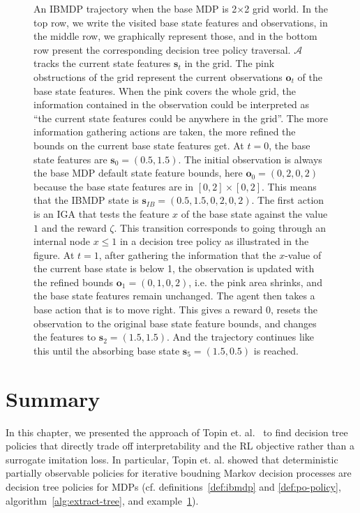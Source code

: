 \begin{figure}
\begin{tikzpicture}[scale=0.6]
    
\end{tikzpicture}
\caption{An IBMDP trajectory when the base MDP is 2$\times$2 grid world. In the top row, we write the visited base state features and observations, in the middle row, we graphically represent those, and in the bottom row present the corresponding decision tree policy traversal.
$\mathcal{A}$ tracks the current state features $\boldsymbol{s}_t$ in the grid.
The pink obstructions of the grid represent the current observations $\boldsymbol{o}_t$ of the base state features.
When the pink covers the whole grid, the information contained in the observation could be interpreted as ``the current state features could be anywhere in the grid''.
The more information gathering actions are taken, the more refined the bounds on the current base state features get.
At $t=0$, the base state features are $\boldsymbol{s}_0 = (0.5, 1.5)$. 
The initial observation is always the base MDP default state feature bounds, here $\boldsymbol{o}_0=(0, 2, 0, 2)$ because the base state features are in $[0, 2] \times [0, 2]$.
This means that the IBMDP state is $\boldsymbol{s}_{IB} = (0.5, 1.5, 0, 2, 0, 2)$.
The first action is an IGA that tests the feature $x$ of the base state against the value $1$ and the reward $\zeta$. 
This transition corresponds to going through an internal node $ x\leq 1$ in a decision tree policy as illustrated in the figure. 
At $t=1$, after gathering the information that the $x$-value of the current base state is below 1, the observation is updated with the refined bounds $\boldsymbol{o}_1=(0, 1, 0, 2)$, i.e. the pink area shrinks, and the base state features remain unchanged.
The agent then takes a base action that is to move right. 
This gives a reward 0, resets the observation to the original base state feature bounds, and changes the features to $\boldsymbol{s}_2=(1.5, 1.5)$. And the trajectory continues like this until the absorbing base state $\boldsymbol{s}_5=(1.5, 0.5)$ is reached.}
\label{example:ibmdp}
\end{figure}

\section{Summary}
In this chapter, we presented the approach of Topin et. al.~\cite{topin2021iterative} to find decision tree policies that directly trade off interpretability and the RL objective rather than a surrogate imitation loss.
In particular, Topin et. al. showed that deterministic partially observable policies for iterative boudning Markov decision processes are decision tree policies for MDPs (cf. definitions~\ref{def:ibmdp} and \ref{def:po-policy}, algorithm~\ref{alg:extract-tree}, and example~\ref{example:ibmdp}).


